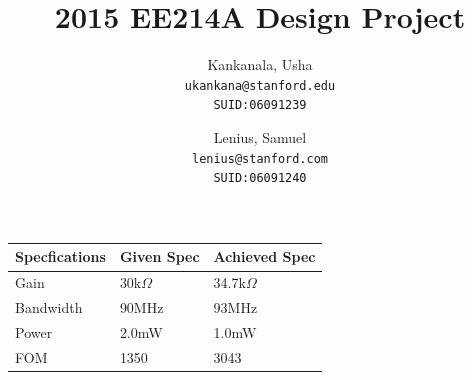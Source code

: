 \documentclass[12pt,a4paper]{article}
\begin{document}

\setcounter{page}{0}



\author{
  Kankanala, Usha\\
  \texttt{ukankana@stanford.edu}\\
  \texttt{SUID:06091239}
  \and
  Lenius, Samuel\\
  \texttt{lenius@stanford.com}\\
  \texttt{SUID:06091240}
}

\title{2015 EE214A Design Project}

\maketitle


\begin{table}[h]
	\centering
	\begin{tabular}{ | l | l | l |}
		\hline
		\textbf{Specfications} & Given Spec & Achieved Spec\\
		\hline
			Gain & 30k$\Omega$  &  34.7k$\Omega$ \\
		\hline
			Bandwidth & 90MHz  &  93MHz \\
		\hline
			Power & 2.0mW  &  1.0mW \\
		\hline
			FOM & 1350  &  3043 \\
		\hline
	\end{tabular}
\end{table}
\end{document}
